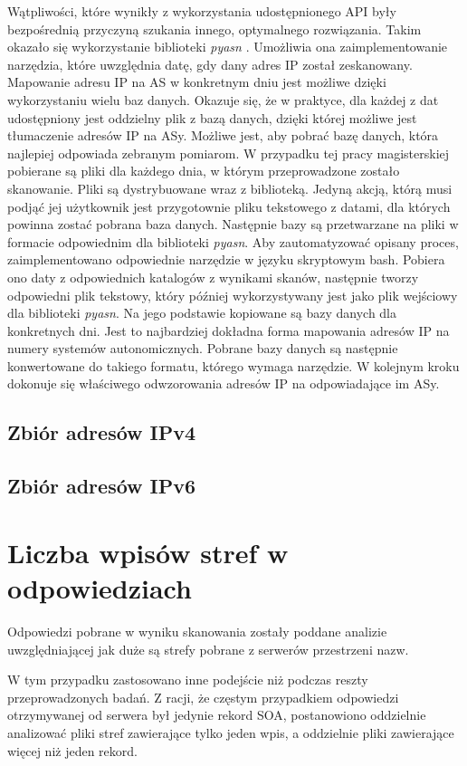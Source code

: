Wątpliwości, które wynikły z wykorzystania udostępnionego API były bezpośrednią przyczyną szukania innego, optymalnego rozwiązania. Takim okazało się wykorzystanie biblioteki \textit{pyasn} \cite{pyasn}. Umożliwia ona zaimplementowanie narzędzia, które uwzględnia datę, gdy dany adres IP został zeskanowany. Mapowanie adresu IP na AS w konkretnym dniu jest możliwe dzięki wykorzystaniu wielu baz danych. Okazuje się, że w praktyce, dla każdej z dat udostępniony jest oddzielny plik z bazą danych, dzięki której możliwe jest tłumaczenie adresów IP na ASy. Możliwe jest, aby pobrać bazę danych, która najlepiej odpowiada zebranym pomiarom. W przypadku tej pracy magisterskiej pobierane są pliki dla każdego dnia, w którym przeprowadzone zostało skanowanie. Pliki są dystrybuowane wraz z biblioteką. Jedyną akcją, którą musi podjąć jej użytkownik jest przygotownie pliku tekstowego z datami, dla których powinna zostać pobrana baza danych. Następnie bazy są przetwarzane na pliki w formacie odpowiednim dla biblioteki \textit{pyasn}. Aby zautomatyzować opisany proces, zaimplementowano odpowiednie narzędzie w języku skryptowym bash. Pobiera ono daty z odpowiednich katalogów z wynikami skanów, następnie tworzy odpowiedni plik tekstowy, który później wykorzystywany jest jako plik wejściowy dla biblioteki \textit{pyasn}. Na jego podstawie kopiowane są bazy danych dla konkretnych dni. Jest to najbardziej dokładna forma mapowania adresów IP na numery systemów autonomicznych. Pobrane bazy danych są następnie konwertowane do takiego formatu, którego wymaga narzędzie. W kolejnym kroku dokonuje się właściwego odwzorowania adresów IP na odpowiadające im ASy.

\subsection{Zbiór adresów IPv4}


\subsection{Zbiór adresów IPv6}

\section{Liczba wpisów stref w odpowiedziach}
Odpowiedzi pobrane w wyniku skanowania zostały poddane analizie uwzględniającej jak duże są strefy pobrane z serwerów przestrzeni nazw. 

W tym przypadku zastosowano inne podejście niż podczas reszty przeprowadzonych badań. Z racji, że częstym przypadkiem odpowiedzi otrzymywanej od serwera był jedynie rekord SOA, postanowiono oddzielnie analizować pliki stref zawierające tylko jeden wpis, a oddzielnie pliki zawierające więcej niż jeden rekord.

